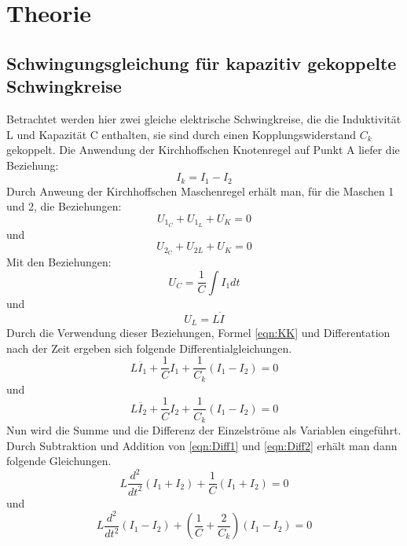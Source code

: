 \section{Theorie}
\label{sec:Theorie}


\subsection{Schwingungsgleichung für kapazitiv gekoppelte Schwingkreise}
Betrachtet werden hier zwei gleiche elektrische Schwingkreise, die die Induktivität L und Kapazität C enthalten,
sie sind durch einen Kopplungswiderstand $ C_k$ gekoppelt.
Die Anwendung der Kirchhoffschen Knotenregel auf Punkt A liefer die Beziehung:
\begin{equation}
 I_k = I_1 - I_2
 \label{eqn:KK}
\end{equation}
Durch Anweung der Kirchhoffschen Maschenregel erhält man, für die Maschen 1 und 2, die Beziehungen:
\begin{equation}
  U_{1_{C}} + U_{1_{L}} + U_K = 0
  \label{eqn:KM1}
\end{equation}
 und
 \begin{equation}
   U_{2_{C}} + U_{2{L}} + U_K = 0
   \label{eqn:KM2}
 \end{equation}
 Mit den Beziehungen:
 \begin{equation*}
   U_C = \frac{1}{C} \int I_1 dt
 \end{equation*}
 und
 \begin{equation*}
   U_L = L\dot{I}
\end{equation*}
Durch die Verwendung dieser Beziehungen, Formel \eqref{eqn:KK} und Differentation nach der Zeit ergeben sich folgende Differentialgleichungen.
\begin{equation}
  L\ddot{I_1} + \frac{1}{C}I_1 + \frac{1}{C_k}(I_1 - I_2) = 0
  \label{eqn:Diff1}
\end{equation}
und
\begin{equation}
  L\ddot{I_2} + \frac{1}{C}I_2 + \frac{1}{C_k}(I_1 - I_2) = 0
  \label{eqn:Diff2}
\end{equation}
Nun wird die Summe und die Differenz der Einzelströme als Variablen eingeführt. Durch Subtraktion und Addition von \eqref{eqn:Diff1} und \eqref{eqn:Diff2} erhält man dann folgende Gleichungen.
\begin{equation}
  L \frac{d^2}{dt^2}(I_1 + I_2) + \frac{1}{C} (I_1 + I_2) = 0
  \label{eqn:Diff1p}
\end{equation}
und
\begin{equation}
  L \frac{d^2}{dt^2}(I_1 - I_2) + \left(\frac{1}{C} + \frac{2}{C_k}\right) (I_1 - I_2) = 0
  \label{eqn:Diff2m}
\end{equation}
